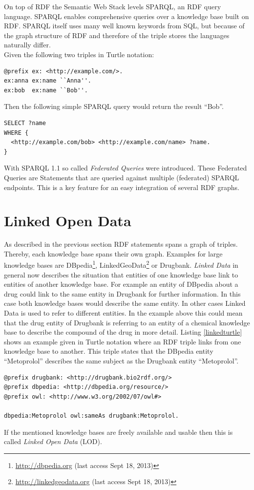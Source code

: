 On top of RDF the Semantic Web Stack levels SPARQL, an RDF query language.
SPARQL enables comprehensive queries over a knowledge base built on RDF.
SPARQL itself uses many well known keywords from SQL, but because of the graph structure of RDF and therefore of the triple stores the languages naturally differ.\\
Given the following two triples in Turtle notation:
\begin{lstlisting}[numbers=none,caption=Example Turtle triples]
@prefix ex: <http://example.com/>.
ex:anna ex:name ``Anna''.
ex:bob  ex:name ``Bob''. 
\end{lstlisting}
Then the following simple SPARQL query would return the result ``Bob''.
\begin{lstlisting}[numbers=none,caption=Example SPARQL query]
SELECT ?name
WHERE {
  <http://example.com/bob> <http://example.com/name> ?name.
}
\end{lstlisting}

With SPARQL 1.1 so called \textit{Federated Queries} were introduced.
These Federated Queries are Statements that are queried against multiple (federated) SPARQL endpoints.
This is a key feature for an easy integration of several RDF graphs.

\section{Linked Open Data}
\label{sec:linked-open-data}
As described in the previous section RDF statements spans a graph of triples.
Thereby, each knowledge base spans their own graph.
Examples for large knowledge bases are DBpedia\footnote{\url{http://dbpedia.org} (last access Sept 18, 2013)}, LinkedGeoData\footnote{\url{http://linkedgeodata.org} (last access Sept 18, 2013)} or Drugbank.
\textit{Linked Data} in general now describes the situation that entities of one knowledge base link to entities of another knowledge base.
For example an entity of DBpedia about a drug could link to the same entity in Drugbank for further information.
In this case both knowledge bases would describe the same entity.
In other cases Linked Data is used to refer to different entities.
In the example above this could mean that the drug entity of Drugbank is referring to an entity of a chemical knowledge base to describe the compound of the drug in more detail.
Listing \ref{linkedturtle} shows an example given in Turtle notation where an RDF triple links from one knowledge base to another.
This triple states that the DBpedia entity ``Metoprolol'' describes the same subject as the Drugbank entity ``Metoprolol''.
\begin{lstlisting}[numbers=none,caption=Example triple for linking two entities of different knowledge bases,label=linkedturtle]
@prefix drugbank: <http://drugbank.bio2rdf.org/>
@prefix dbpedia: <http://dbpedia.org/resource/>
@prefix owl: <http://www.w3.org/2002/07/owl#>

dbpedia:Metoprolol owl:sameAs drugbank:Metoprolol.
\end{lstlisting}
If the mentioned knowledge bases are freely available and usable then this is called \textit{Linked Open Data} (LOD).

